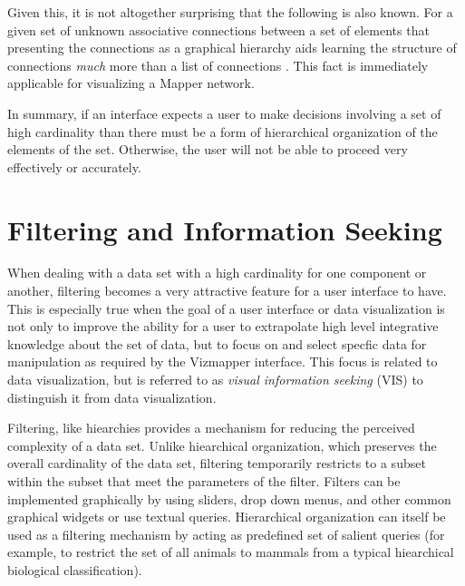 Given this, it is not altogether surprising that the following is also known. For a given set of unknown associative connections between a set of elements that presenting the connections as a graphical hierarchy aids learning the structure of connections \emph{much} more than a list of connections \cite{graphicalhierarchy1972}. This fact is immediately applicable for visualizing a Mapper network.

In summary, if an interface expects a user to make decisions involving a set of high cardinality than there must be a form of hierarchical organization of the elements of the set. Otherwise, the user will not be able to proceed very effectively or accurately.

\section{Filtering and Information Seeking}

\begin{comment}
The Structure of the Information Visualization Design Space, Section 5
dynamic queries technique 

Visual Information Seeking: Tight Coupling of Dynamic Query Filters with Starfield Displays
\end{comment}

When dealing with a data set with a high cardinality for one component or another, filtering becomes a very attractive feature for a user interface to have. This is especially true when the goal of a user interface or data visualization is not only to improve the ability for a user to extrapolate high level integrative knowledge about the set of data, but to focus on and select specfic data for manipulation as required by the Vizmapper interface. This focus is related to data visualization, but is referred to as \emph{visual information seeking} (VIS) to distinguish it from data visualization. 

Filtering, like hiearchies provides a mechanism for reducing the perceived complexity of a data set. Unlike hiearchical organization, which preserves the overall cardinality of the data set, filtering temporarily restricts to a subset within the subset that meet the parameters of the filter. Filters can be implemented graphically by using sliders, drop down menus, and other common graphical widgets or use textual queries. Hierarchical organization can itself be used as a filtering mechanism by acting as predefined set of salient queries (for example, to restrict the set of all animals to mammals from a typical hiearchical biological classification).

